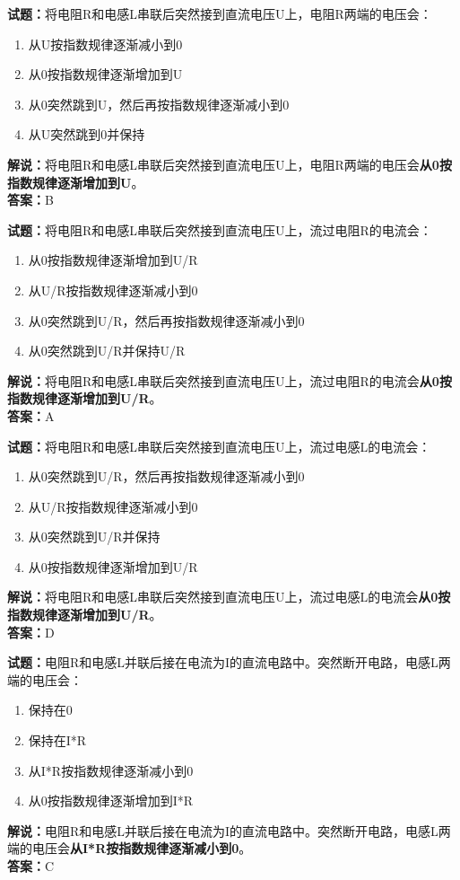 \documentclass{ctexbook}
\begin{document}
\bigskip


\noindent\textbf{试题：}将电阻R和电感L串联后突然接到直流电压U上，电阻R两端的电压会：
\begin{enumerate}[leftmargin=3em]
\item 从U按指数规律逐渐减小到0
\item 从0按指数规律逐渐增加到U
\item 从0突然跳到U，然后再按指数规律逐渐减小到0
\item 从U突然跳到0并保持
\end{enumerate}
\noindent\textbf{解说：}将电阻R和电感L串联后突然接到直流电压U上，电阻R两端的电压会\textbf{从0按指数规律逐渐增加到U}。\\\noindent\textbf{答案：}B




\bigskip


\noindent\textbf{试题：}将电阻R和电感L串联后突然接到直流电压U上，流过电阻R的电流会：
\begin{enumerate}[leftmargin=3em]
\item 从0按指数规律逐渐增加到U/R
\item 从U/R按指数规律逐渐减小到0
\item 从0突然跳到U/R，然后再按指数规律逐渐减小到0
\item 从0突然跳到U/R并保持U/R
\end{enumerate}
\noindent\textbf{解说：}将电阻R和电感L串联后突然接到直流电压U上，流过电阻R的电流会\textbf{从0按指数规律逐渐增加到U/R}。\\\noindent\textbf{答案：}A




\bigskip


\noindent\textbf{试题：}将电阻R和电感L串联后突然接到直流电压U上，流过电感L的电流会：
\begin{enumerate}[leftmargin=3em]
\item 从0突然跳到U/R，然后再按指数规律逐渐减小到0
\item 从U/R按指数规律逐渐减小到0
\item 从0突然跳到U/R并保持
\item 从0按指数规律逐渐增加到U/R
\end{enumerate}
\noindent\textbf{解说：}将电阻R和电感L串联后突然接到直流电压U上，流过电感L的电流会\textbf{从0按指数规律逐渐增加到U/R}。\\\noindent\textbf{答案：}D




\bigskip


\noindent\textbf{试题：}电阻R和电感L并联后接在电流为I的直流电路中。突然断开电路，电感L两端的电压会：
\begin{enumerate}[leftmargin=3em]
\item 保持在0
\item 保持在I*R
\item 从I*R按指数规律逐渐减小到0
\item 从0按指数规律逐渐增加到I*R
\end{enumerate}
\noindent\textbf{解说：}电阻R和电感L并联后接在电流为I的直流电路中。突然断开电路，电感L两端的电压会\textbf{从I*R按指数规律逐渐减小到0}。\\\noindent\textbf{答案：}C
\end{document}
